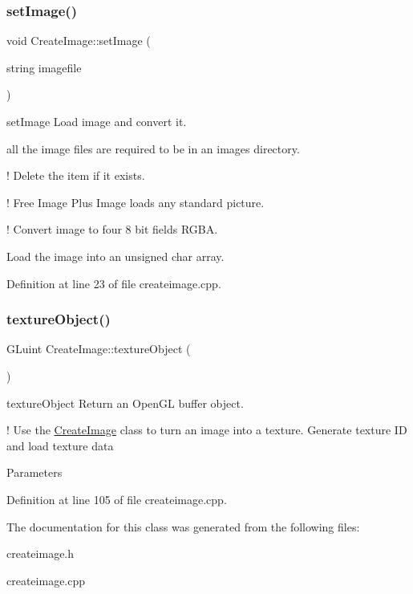 \subsubsection{\texorpdfstring{set\+Image()}{setImage()}}
{\footnotesize\ttfamily void Create\+Image\+::set\+Image (\begin{DoxyParamCaption}\item[{string}]{imagefile }\end{DoxyParamCaption})}



set\+Image Load image and convert it. 

all the image files are required to be in an images directory.

! Delete the item if it exists.

! Free Image Plus Image loads any standard picture.

! Convert image to four 8 bit fields R\+G\+BA.

Load the image into an unsigned char array. 

Definition at line 23 of file createimage.\+cpp.

\mbox{\label{classCreateImage_a529a1307050df8719e180e006141b762}} 
\subsubsection{\texorpdfstring{texture\+Object()}{textureObject()}}
{\footnotesize\ttfamily G\+Luint Create\+Image\+::texture\+Object (\begin{DoxyParamCaption}{ }\end{DoxyParamCaption})}



texture\+Object Return an Open\+GL buffer object. 

! Use the \hyperlink{classCreateImage}{Create\+Image} class to turn an image into a texture. Generate texture ID and load texture data

Parameters 

Definition at line 105 of file createimage.\+cpp.



The documentation for this class was generated from the following files\+:\begin{DoxyCompactItemize}
\item 
createimage.\+h\item 
createimage.\+cpp\end{DoxyCompactItemize}

